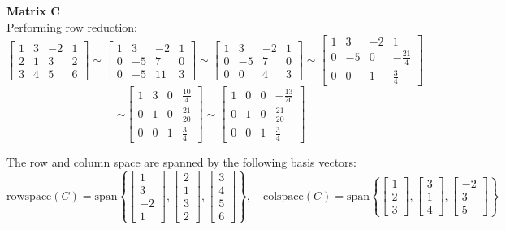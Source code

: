 \documentclass{article}
\begin{document}
\newpage
\noindent\textbf{Matrix C} \\
Performing row reduction:
$$
\begin{bmatrix} 1 & 3 & -2 & 1 \\ 2 & 1 & 3 & 2 \\ 3 & 4 & 5 & 6 \end{bmatrix}
\sim
\begin{bmatrix} 1 & 3 & -2 & 1 \\ 0 & -5 & 7 & 0 \\ 0 & -5 & 11 & 3 \end{bmatrix}
\sim
\begin{bmatrix} 1 & 3 & -2 & 1 \\ 0 & -5 & 7 & 0 \\ 0 & 0 & 4 & 3 \end{bmatrix}
\sim
\begin{bmatrix} 1 & 3 & -2 & 1 \\ 0 & -5 & 0 & -\frac{21}{4} \\ 0 & 0 & 1 & \frac{3}{4} \end{bmatrix}
$$ $$ \sim
\begin{bmatrix} 1 & 3 & 0 & \frac{10}{4} \\ 0 & 1 & 0 & \frac{21}{20} \\ 0 & 0 & 1 & \frac{3}{4} \end{bmatrix}
\sim
\begin{bmatrix} 1 & 0 & 0 & -\frac{13}{20} \\ 0 & 1 & 0 & \frac{21}{20} \\ 0 & 0 & 1 & \frac{3}{4} \end{bmatrix}
$$

\noindent The row and column space are spanned by the following basis vectors:
$$
\text{rowspace}(C) = \text{span}\left\{ \begin{bmatrix} 1 \\ 3 \\ -2 \\ 1 \end{bmatrix}, \begin{bmatrix} 2 \\ 1 \\ 3 \\ 2 \end{bmatrix}, \begin{bmatrix} 3 \\ 4 \\ 5 \\ 6 \end{bmatrix} \right\}
,\quad
\text{colspace}(C) = \text{span}\left\{ \begin{bmatrix} 1 \\ 2 \\ 3 \end{bmatrix}, \begin{bmatrix} 3 \\ 1 \\ 4 \end{bmatrix}, \begin{bmatrix} -2 \\ 3 \\ 5 \end{bmatrix} \right\}
$$
\end{document}
